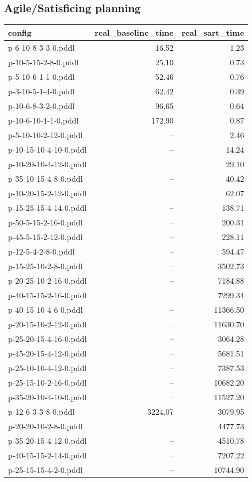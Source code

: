\documentclass{article}
\begin{document}
                    \subsection*{Agile/Satisficing planning}
                    
                            \begin{center}
                            \scriptsize
                            \begin{tabular}{@{}l|r|r@{}}
                            config & real\_baseline\_time & real\_sart\_time\\\midrule
                             p-6-10-8-3-3-0.pddl&16.52&1.23\\
 p-10-5-15-2-8-0.pddl&25.10&0.73\\
 p-5-10-6-1-1-0.pddl&52.46&0.76\\
 p-3-10-5-1-4-0.pddl&62.42&0.39\\
 p-10-6-8-3-2-0.pddl&96.65&0.64\\
 p-10-6-10-1-1-0.pddl&172.90&0.87\\
 p-5-10-10-2-12-0.pddl&--&2.46\\
 p-10-15-10-4-10-0.pddl&--&14.24\\
 p-10-20-10-4-12-0.pddl&--&29.10\\
 p-35-10-15-4-8-0.pddl&--&40.42\\
 p-10-20-15-2-12-0.pddl&--&62.07\\
 p-15-25-15-4-14-0.pddl&--&138.71\\
 p-50-5-15-2-16-0.pddl&--&200.31\\
 p-45-5-15-2-12-0.pddl&--&228.11\\
 p-12-5-4-2-8-0.pddl&--&594.47\\
 p-15-25-10-2-8-0.pddl&--&3502.73\\
 p-20-25-10-2-16-0.pddl&--&7184.88\\
 p-40-15-15-2-16-0.pddl&--&7299.34\\
 p-40-15-10-4-6-0.pddl&--&11366.50\\
 p-20-15-10-2-12-0.pddl&--&11630.70\\
 p-25-20-15-4-16-0.pddl&--&3064.28\\
 p-45-20-15-4-12-0.pddl&--&5681.51\\
 p-25-10-10-4-12-0.pddl&--&7387.53\\
 p-25-15-10-2-16-0.pddl&--&10682.20\\
 p-35-20-10-4-10-0.pddl&--&11527.20\\
 p-12-6-3-3-8-0.pddl&3224.07&3079.95\\
 p-20-20-10-2-8-0.pddl&--&4477.73\\
 p-35-20-15-4-12-0.pddl&--&4510.78\\
 p-40-15-15-2-14-0.pddl&--&7207.22\\
 p-25-15-15-4-2-0.pddl&--&10744.90
                            \end{tabular}
                            \end{center}
                    
\end{document}

